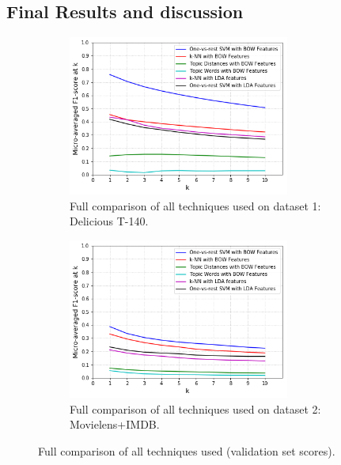 \subsection{Final Results and discussion}

\begin{figure}[H]
    \begin{subfigure}{0.5\textwidth}
        \centering
    \includegraphics[width=0.8\textwidth]{chapters/05_experiments/images/full-comparison-dataset-1.png}
    \caption{Full comparison of all techniques used on dataset 1: Delicious T-140.}
    \label{fig:full_comparison_dataset_1}
    \end{subfigure}
    \begin{subfigure}{0.5\textwidth}
        \centering
    \includegraphics[width=0.8\textwidth]{chapters/05_experiments/images/full-comparison-dataset-2.png}
    \caption{Full comparison of all techniques used on dataset 2: Movielens+IMDB.}
    \label{fig:full_comparison_dataset_2}
    \end{subfigure}
    \caption{Full comparison of all techniques used (validation set scores).}
\end{figure}

